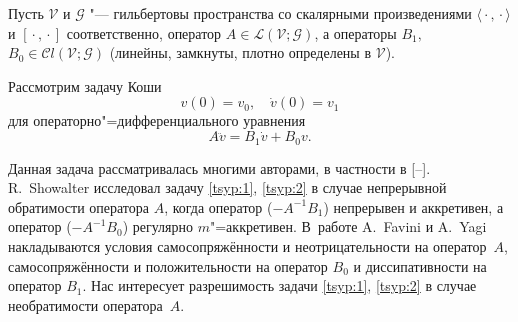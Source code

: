 



\date{19/X/2011} %



\maketitle


Пусть $\mathcal V$ и $\mathcal G$ "--- гильбертовы пространства со скалярными произведениями \mbox{$\langle{}\cdot{}, {}\cdot{}\rangle$} и
$[{}\cdot{}, {}\cdot{}]$ соответственно, оператор $A \in \mathcal L
(\mathcal V;\mathcal G)$, а операторы $B_{1},$ $B_{0} \in
\mathcal Cl (\mathcal V;\mathcal G)$ (линейны, замкнуты, плотно
определены в $\mathcal V$).

Рассмотрим задачу Коши
\begin{equation}
v(0)=v_{0}, \quad \dot{v}(0)=v_{1} 
\label{tsyp:1}
\end{equation}
для операторно"=дифференциального уравнения 
\begin{equation}
A\ddot{v}=B_{1}\dot{v}+B_{0}v.
\label{tsyp:2}
\end{equation} 

Данная задача рассматривалась многими авторами, в частности в [--]. R.~Showalter исследовал задачу \eqref{tsyp:1}, \eqref{tsyp:2} в случае непрерывной обратимости оператора $A$, когда оператор
($-A^{-1}B_{1}$) непрерывен и аккретивен, а оператор ($-A^{-1}B_{0}$) регулярно {$m$"=аккретивен.} 
В~работе A.~Favini и A.~Yagi накладываются условия самосопряжённости и неотрицательности на оператор~$A$, самосопряжённости и положительности на оператор $B_{0}$ и диссипативности на оператор $B_{1}$. 
Нас интересует разрешимость задачи \eqref{tsyp:1}, \eqref{tsyp:2} в случае необратимости оператора~$A$.


